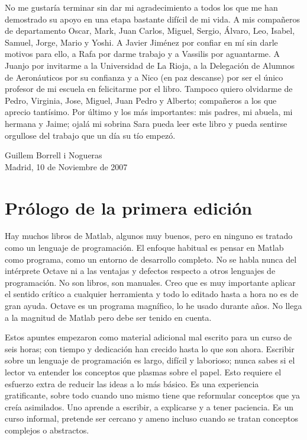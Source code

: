 \documentclass[10pt,fleqn,a4]{book}
\begin{document}
No me gustaría terminar sin dar mi agradecimiento a todos los que me
han demostrado su apoyo en una etapa bastante difícil de mi vida.  A
mis compañeros de departamento Oscar, Mark, Juan Carlos, Miguel,
Sergio, Álvaro, Leo, Isabel, Samuel, Jorge, Mario y Yoshi. A Javier
Jiménez por confiar en mí sin darle motivos para ello, a Rafa por
darme trabajo y a Vassilis por aguantarme. A Juanjo por invitarme a la
Universidad de La Rioja, a la Delegación de Alumnos de Aeronáuticos
por su confianza y a Nico (en paz descanse) por ser el único profesor
de mi escuela en felicitarme por el libro. Tampoco quiero olvidarme de
Pedro, Virginia, Jose, Miguel, Juan Pedro y Alberto; compañeros a los
que aprecio tantísimo.  Por último y los más importantes: mis padres,
mi abuela, mi hermana y Jaime; ojalá mi sobrina Sara pueda leer este
libro y pueda sentirse orgullose del trabajo que un día su tío empezó.

\vspace{2cm}
\begin{flushright}
Guillem Borrell i Nogueras\\
Madrid, 10 de Noviembre de 2007
\end{flushright}

\chapter*{Prólogo de la primera edición}

Hay muchos libros de Matlab, algunos muy buenos, pero en ninguno es
tratado como un lenguaje de programación. El enfoque habitual es
pensar en Matlab como programa, como un entorno de desarrollo
completo. No se habla nunca del intérprete Octave ni a las ventajas y
defectos respecto a otros lenguajes de programación. No son libros,
son manuales.  Creo que es muy importante aplicar el sentido crítico a
cualquier herramienta y todo lo editado hasta a hora no es de gran
ayuda. Octave es un programa magnífico, lo he usado durante años. No
llega a la magnitud de Matlab pero debe ser tenido en cuenta.

Estos apuntes empezaron como material adicional mal escrito para un
curso de seis horas; con tiempo y dedicación han crecido hasta lo que
son ahora. Escribir sobre un lenguaje de programación es largo,
difícil y laborioso; nunca sabes si el lector va entender los
conceptos que plasmas sobre el papel. Esto requiere el esfuerzo extra
de reducir las ideas a lo más básico. Es una experiencia gratificante,
sobre todo cuando uno mismo tiene que reformular conceptos que ya
creía asimilados. Uno aprende a escribir, a explicarse y a tener
paciencia.  Es un curso informal, pretende ser cercano y ameno incluso
cuando se tratan conceptos complejos o abstractos.
\end{document}
